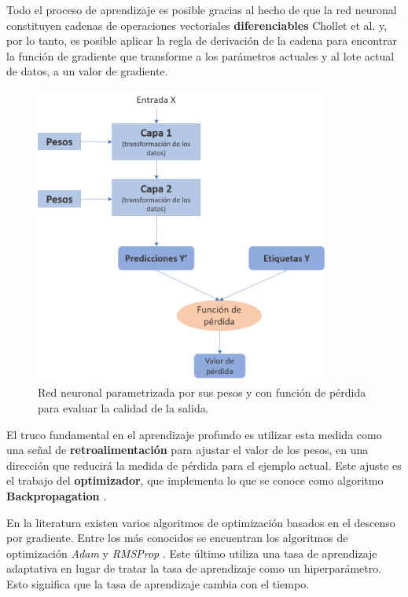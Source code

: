 Todo el proceso de aprendizaje es posible gracias al hecho de que la red neuronal constituyen cadenas de operaciones vectoriales \textbf{diferenciables} Chollet et al. \cite{Chollet} y, por lo tanto, es posible aplicar la regla de derivación de la cadena para encontrar la función de gradiente que transforme a los parámetros actuales y al lote actual de datos, a un valor de gradiente.

 \begin{figure}[!h]
	\centering
	
	\includegraphics[width=3.8in]{Graphics/redLoss.png}
	
	\caption{ \small{Red neuronal parametrizada por sus pesos y con función de pérdida para evaluar la calidad de la salida.}}
	
	\label{RedLoss}
	
\end{figure}

El truco fundamental en el aprendizaje profundo es utilizar esta medida como una señal de \textbf{retroalimentación} para ajustar el valor de los pesos, en una dirección que reducirá la medida de pérdida para el ejemplo actual. Este ajuste es el trabajo del \textbf{optimizador}, que implementa lo que se conoce como algoritmo \textbf{Backpropagation} \cite{Chollet}.

En la literatura existen varios algoritmos de optimización basados en el descenso por gradiente. Entre los más conocidos se encuentran los algoritmos de optimización \textit{Adam} y \textit{RMSProp} \cite{BengioGood}. Este último utiliza una tasa de aprendizaje adaptativa en lugar de tratar la tasa de aprendizaje como un hiperparámetro. Esto significa que la tasa de aprendizaje cambia con el tiempo.  


